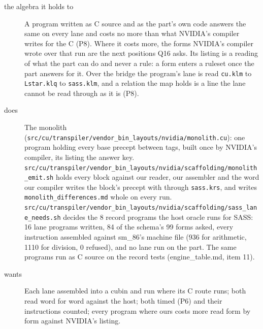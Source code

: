 \begin{description}
\item[{the algebra it holds to}] A program written as C source and as the part's own code answers the same on every lane and costs no more than what NVIDIA's compiler writes for the C (P8). Where it costs more, the forms NVIDIA's compiler wrote over that run are the next positions Q16 asks. Its listing is a reading of what the part can do and never a rule: a form enters a ruleset once the part answers for it. Over the bridge the program's lane is read \texttt{cu.\allowbreak{}klm} to \texttt{Lstar.\allowbreak{}klq} to \texttt{sass.\allowbreak{}klm}, and a relation the map holds is a line the lane cannot be read through as it is (P8).
\item[{does}] The monolith (\texttt{src/\allowbreak{}cu/\allowbreak{}transpiler/\allowbreak{}vendor\_\allowbreak{}bin\_\allowbreak{}layouts/\allowbreak{}nvidia/\allowbreak{}monolith.\allowbreak{}cu}): one program holding every base precept between tags, built once by NVIDIA's compiler, its listing the answer key. \texttt{src/\allowbreak{}cu/\allowbreak{}transpiler/\allowbreak{}vendor\_\allowbreak{}bin\_\allowbreak{}layouts/\allowbreak{}nvidia/\allowbreak{}scaffolding/\allowbreak{}monolith\_\allowbreak{}emit.\allowbreak{}sh} holds every block against our reader, our assembler and the word our compiler writes the block's precept with through \texttt{sass.\allowbreak{}krs}, and writes \texttt{monolith\_\allowbreak{}differences.\allowbreak{}md} whole on every run. \texttt{src/\allowbreak{}cu/\allowbreak{}transpiler/\allowbreak{}vendor\_\allowbreak{}bin\_\allowbreak{}layouts/\allowbreak{}nvidia/\allowbreak{}scaffolding/\allowbreak{}sass\_\allowbreak{}lane\_\allowbreak{}needs.\allowbreak{}sh} decides the 8 record programs the host oracle runs for SASS: 16 lane programs written, 84 of the schema's 99 forms asked, every instruction assembled against sm\_\allowbreak{}86's machine file (936 for arithmetic, 1110 for division, 0 refused), and no lane run on the part. The same programs run as C source on the record tests (engine\_\allowbreak{}table.md, item 11).
\item[{wants}] Each lane assembled into a cubin and run where its C route runs; both read word for word against the host; both timed (P6) and their instructions counted; every program where ours costs more read form by form against NVIDIA's listing.

\end{description}
